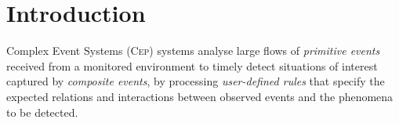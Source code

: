 \chapter{Introduction}
\label{sec:Introduction}

Complex Event Systems (\textsc{Cep}) systems analyse large flows of \emph{primitive events} received from a monitored environment to timely detect situations of interest captured by \emph{composite events}, by processing \emph{user-defined rules} that specify the expected relations and interactions between observed events and the phenomena to be detected.